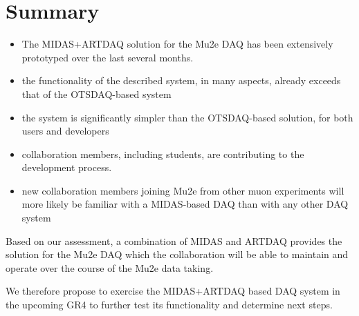 \section {Summary}

\begin{itemize}
\item 
  The MIDAS+ARTDAQ solution for the Mu2e DAQ has been extensively prototyped
  over the last several months.
\item
  the functionality of the described system, in many aspects,
  already exceeds that of the OTSDAQ-based system  
\item
  the system is significantly simpler than the OTSDAQ-based solution,
  for both users and developers
\item
  collaboration members, including students, are contributing
  to the development process. 
\item
  new collaboration members joining Mu2e from other muon experiments
  will more likely be familiar with a MIDAS-based DAQ than with
  any other DAQ system
\end{itemize}

Based on our assessment, a combination of MIDAS and ARTDAQ provides
the solution for the Mu2e DAQ which the collaboration will be able
to maintain and operate over the course of the Mu2e data taking.

\vspace{0.2in}
We therefore propose to exercise the MIDAS+ARTDAQ based DAQ system
in the upcoming GR4 to further test its functionality and determine
next steps. 

